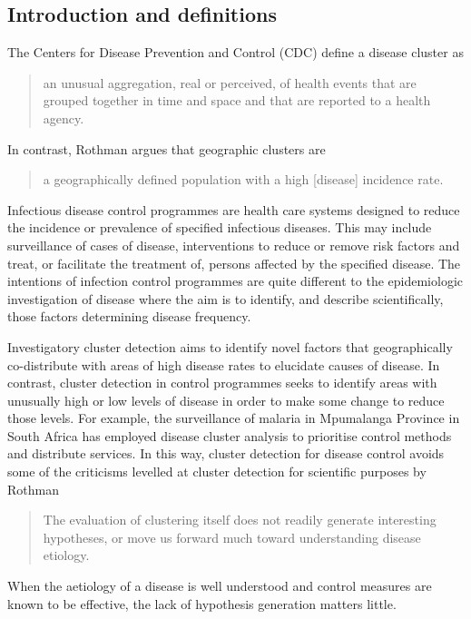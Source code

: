 \documentclass[a4paper,11pt]{article}
\begin{document}
\subsection{Introduction and definitions}
The Centers for Disease Prevention and Control (CDC) define a disease cluster as 
\begin{quotation}
 an unusual aggregation, real or perceived, of health events that are grouped together in time and space and that are reported to a health agency.\cite{cdc1990}
\end{quotation}
In contrast, Rothman argues that geographic clusters are 
\begin{quotation}
 a geographically defined population with a high [disease] incidence rate.\cite{Rothman1990}
\end{quotation}

Infectious disease control programmes are health care systems designed to reduce the incidence or prevalence of specified infectious diseases. 
This may include surveillance of cases of disease, interventions to reduce or remove risk factors and treat, or facilitate the treatment of, persons affected by the specified disease. 
The intentions of infection control programmes are quite different to the epidemiologic investigation of disease where the aim is to identify, and describe scientifically, those factors determining disease frequency. 

Investigatory cluster detection aims to identify novel factors that geographically co-distribute with areas of high disease rates to elucidate causes of disease.
In contrast, cluster detection in control programmes seeks to identify areas with unusually high or low levels of disease in order to make some change to reduce those levels. 
For example, the surveillance of malaria in Mpumalanga Province in South Africa has employed disease cluster analysis to prioritise control methods and distribute services. \cite{Coleman2009}
In this way, cluster detection for disease control avoids some of the criticisms levelled at cluster detection for scientific purposes by Rothman
\begin{quotation}
 The evaluation of clustering itself does not readily generate interesting hypotheses, or move us forward much toward understanding disease etiology. 
\end{quotation}
When the aetiology of a disease is well understood and control measures are known to be effective, the lack of hypothesis generation matters little. 
\end{document}
